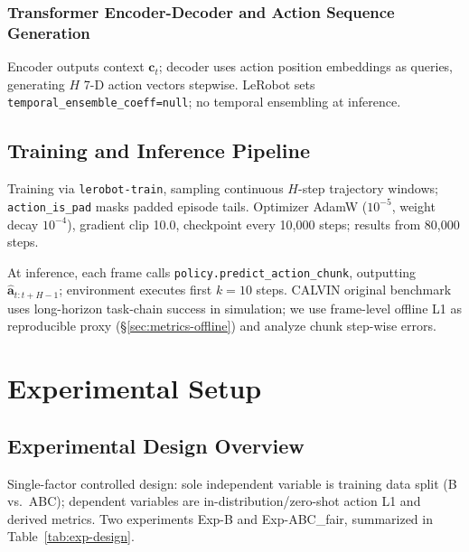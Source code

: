 \documentclass[10pt,twocolumn,letterpaper]{article}
\newcommand{\tabref}[1]{Table~\ref{#1}}
\begin{document}
\subsubsection{Transformer Encoder-Decoder and Action Sequence Generation}

Encoder outputs context $\mathbf{c}_t$; decoder uses action position embeddings as queries, generating $H$ 7-D action vectors stepwise. LeRobot sets \texttt{temporal\_ensemble\_coeff=null}; no temporal ensembling at inference.

\subsection{Training and Inference Pipeline}

Training via \texttt{lerobot-train}, sampling continuous $H$-step trajectory windows; \texttt{action\_is\_pad} masks padded episode tails. Optimizer AdamW ($10^{-5}$, weight decay $10^{-4}$), gradient clip 10.0, checkpoint every 10{,}000 steps; results from 80{,}000 steps.

At inference, each frame calls \texttt{policy.predict\_action\_chunk}, outputting $\hat{\mathbf{a}}_{t:t+H-1}$; environment executes first $k{=}10$ steps. CALVIN original benchmark uses long-horizon task-chain success in simulation\cite{mees2022calvin}; we use frame-level offline L1 as reproducible proxy (\S\ref{sec:metrics-offline}) and analyze chunk step-wise errors.

\section{Experimental Setup}

\subsection{Experimental Design Overview}

Single-factor controlled design: sole independent variable is training data split (B vs.\ ABC); dependent variables are in-distribution/zero-shot action L1 and derived metrics. Two experiments Exp-B and Exp-ABC\_fair, summarized in \tabref{tab:exp-design}.

\begin{table}[H]
  \centering
  \caption{Controlled experimental conditions}
  \label{tab:exp-design}
  \footnotesize
\end{table}
\end{document}

